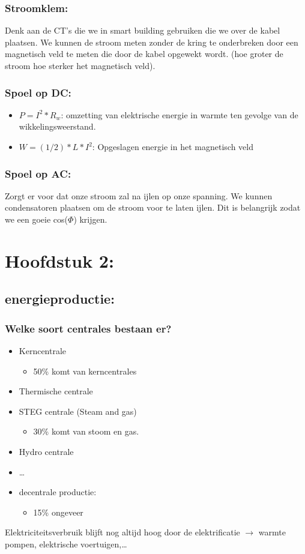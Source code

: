 \documentclass[12pt]{article}
\begin{document}
\subsubsection{Stroomklem:}
Denk aan de CT's die we in smart building gebruiken die we over de kabel plaatsen. We kunnen de stroom meten zonder de kring te onderbreken door een magnetisch veld te meten die door de kabel opgewekt wordt. (hoe groter de stroom hoe sterker het magnetisch veld).
\subsubsection{Spoel op DC:}
\begin{itemize}
    \item $P=I^2*R_w$: omzetting van elektrische energie in warmte ten gevolge van de wikkelingsweerstand.
    \item $W=(1/2)*L*I^2$: Opgeslagen energie in het magnetisch veld
\end{itemize}

\subsubsection{Spoel op AC:}
Zorgt er voor dat onze stroom zal na ijlen op onze spanning. We kunnen condensatoren plaatsen om de stroom voor te laten ijlen. Dit is belangrijk zodat we een goeie cos($\Phi$) krijgen.
\section{Hoofdstuk 2:}
\subsection{energieproductie:}
\subsubsection{Welke soort centrales bestaan er?}
\begin{itemize}
    \item Kerncentrale\begin{itemize}
        \item 50\% komt van kerncentrales
    \end{itemize}
    \item Thermische centrale
    \item STEG centrale (Steam and gas)\begin{itemize}
        \item 30\% komt van stoom en gas.
    \end{itemize}
    \item Hydro centrale
    \item \dots
    \item decentrale productie:\begin{itemize}
        \item 15\% ongeveer
    \end{itemize}
\end{itemize}
Elektriciteitsverbruik blijft nog altijd hoog door de elektrificatie $\rightarrow$ warmte pompen, elektrische voertuigen,\dots 
\end{document}
